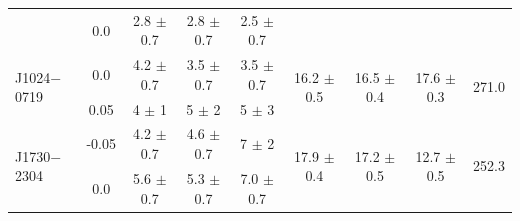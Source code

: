 \documentclass[useAMS,usenatbib]{mn2e}
\begin{document}
\begin{table}
\begin{center}
\begin{tabular}{lcccccccc}
                              & 0.0   &  2.8 $\pm$ 0.7  & 2.8 $\pm$ 0.7  & 2.5 $\pm$ 0.7    &                                 &                                 &                                   &                          \\
\multirow{2}{*}{J1024$-$0719} & 0.0   &  4.2 $\pm$ 0.7  & 3.5 $\pm$ 0.7  & 3.5 $\pm$ 0.7    & \multirow{2}{*}{16.2 $\pm$ 0.5} & \multirow{2}{*}{16.5 $\pm$ 0.4 }& \multirow{2}{*}{17.6 $\pm$ 0.3}   &  \multirow{2}{*}{271.0}  \\
                              & 0.05  &    4 $\pm$ 1    &   5 $\pm$ 2    &   5 $\pm$ 3      &                                 &                                 &                                   &                          \\
\multirow{2}{*}{J1730$-$2304} & -0.05 &  4.2 $\pm$ 0.7  & 4.6 $\pm$ 0.7  &   7 $\pm$ 2      & \multirow{2}{*}{17.9 $\pm$ 0.4} & \multirow{2}{*}{17.2 $\pm$ 0.5 }& \multirow{2}{*}{12.7 $\pm$ 0.5}   &  \multirow{2}{*}{252.3}  \\
                              & 0.0   &  5.6 $\pm$ 0.7  & 5.3 $\pm$ 0.7  & 7.0 $\pm$ 0.7    &                                 &                                 &                                   &                          \\
\hline
\end{tabular}
\end{center}
\end{table}

\newpage
\end{document}
